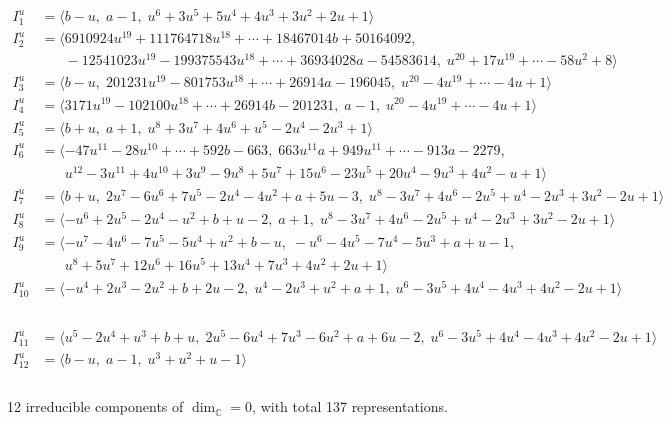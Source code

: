 \documentclass[1p]{elsarticle_modified}
\theoremstyle{definition}
\begin{document}
\begin{align*}
I^u_{1}&=\langle 
b- u,\;a-1,\;u^6+3 u^5+5 u^4+4 u^3+3 u^2+2 u+1\rangle \\
I^u_{2}&=\langle 
6910924 u^{19}+111764718 u^{18}+\cdots+18467014 b+50164092,\\
\phantom{I^u_{2}}&\phantom{= \langle  }-12541023 u^{19}-199375543 u^{18}+\cdots+36934028 a-54583614,\;u^{20}+17 u^{19}+\cdots-58 u^2+8\rangle \\
I^u_{3}&=\langle 
b- u,\;201231 u^{19}-801753 u^{18}+\cdots+26914 a-196045,\;u^{20}-4 u^{19}+\cdots-4 u+1\rangle \\
I^u_{4}&=\langle 
3171 u^{19}-102100 u^{18}+\cdots+26914 b-201231,\;a-1,\;u^{20}-4 u^{19}+\cdots-4 u+1\rangle \\
I^u_{5}&=\langle 
b+u,\;a+1,\;u^8+3 u^7+4 u^6+u^5-2 u^4-2 u^3+1\rangle \\
I^u_{6}&=\langle 
-47 u^{11}-28 u^{10}+\cdots+592 b-663,\;663 u^{11} a+949 u^{11}+\cdots-913 a-2279,\\
\phantom{I^u_{6}}&\phantom{= \langle  }u^{12}-3 u^{11}+4 u^{10}+3 u^9-9 u^8+5 u^7+15 u^6-23 u^5+20 u^4-9 u^3+4 u^2- u+1\rangle \\
I^u_{7}&=\langle 
b+u,\;2 u^7-6 u^6+7 u^5-2 u^4-4 u^2+a+5 u-3,\;u^8-3 u^7+4 u^6-2 u^5+u^4-2 u^3+3 u^2-2 u+1\rangle \\
I^u_{8}&=\langle 
- u^6+2 u^5-2 u^4- u^2+b+u-2,\;a+1,\;u^8-3 u^7+4 u^6-2 u^5+u^4-2 u^3+3 u^2-2 u+1\rangle \\
I^u_{9}&=\langle 
- u^7-4 u^6-7 u^5-5 u^4+u^2+b- u,\;- u^6-4 u^5-7 u^4-5 u^3+a+u-1,\\
\phantom{I^u_{9}}&\phantom{= \langle  }u^8+5 u^7+12 u^6+16 u^5+13 u^4+7 u^3+4 u^2+2 u+1\rangle \\
I^u_{10}&=\langle 
- u^4+2 u^3-2 u^2+b+2 u-2,\;u^4-2 u^3+u^2+a+1,\;u^6-3 u^5+4 u^4-4 u^3+4 u^2-2 u+1\rangle \\
\end{align*}\\
\begin{align*}
I^u_{11}&=\langle 
u^5-2 u^4+u^3+b+u,\;2 u^5-6 u^4+7 u^3-6 u^2+a+6 u-2,\;u^6-3 u^5+4 u^4-4 u^3+4 u^2-2 u+1\rangle \\
I^u_{12}&=\langle 
b- u,\;a-1,\;u^3+u^2+u-1\rangle \\
\\
\end{align*}
\raggedright * 12 irreducible components of $\dim_{\mathbb{C}}=0$, with total 137 representations.\\
\end{document}
